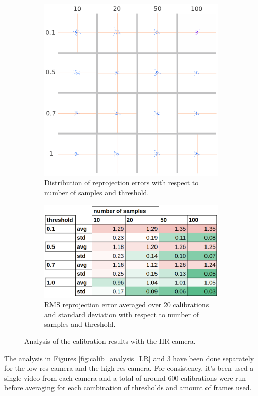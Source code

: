 \begin{figure}[H]
  \centering
  \begin{subfigure}{.5\textwidth}
    \centering
    \includegraphics[width=.8\linewidth]{figures/reprj_dist_HR.png}
    \caption{Distribution of reprojection errors with
    \newline respect to number of samples and threshold.}
    \label{fig:reprj_dist_HR}
  \end{subfigure}%
  \begin{subfigure}{.5\textwidth}
    \centering
    \includegraphics[width=0.8\linewidth]{figures/calib_results_table_HR.png}
    \caption{RMS reprojection error averaged over 20 calibrations and standard deviation with respect to number of samples and threshold.}
    \label{fig:calib_stats_HR}
  \end{subfigure}
  \caption{Analysis of the calibration results with the HR camera.}
  \label{fig:calib_analysis_HR}
\end{figure}
The analysis in Figures \ref{fig:calib_analysis_LR} and \ref{fig:calib_analysis_HR} have been done separately for the low-res camera and the high-res camera. For consistency, it's been used a single video from each camera and a total of around 600 calibrations were run before averaging for each combination of thresholds and amount of frames used.

